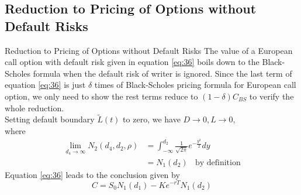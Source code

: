 \documentclass[pdf]{beamer}
\begin{document}
\subsection{Reduction to Pricing of Options without Default Risks}
\begin{frame}[allowframebreaks]{Reduction to Pricing of Options without Default Risks}
The value of a European call option with default risk given in equation \eqref{eq:36} boils down to the Black-Scholes formula when the default risk of writer is ignored. Since the last term of equation \eqref{eq:36} is just $\delta$ times of Black-Scholes pricing formula for European call option, we only need to show the rest terms reduce to $(1-\delta) C_{B S}$ to verify the whole reduction.\\
Setting default boundary $\tilde{L}(t)$ to zero, we have $D \rightarrow 0, L \rightarrow 0,$\\
where
$$
\begin{aligned}
\lim_{d_{4} \rightarrow \infty} N_{2}(d_{4}, d_{2}, \rho) &= \int_{-\infty}^{d_{2}} \frac{1}{\sqrt{2 \pi}} e^{-\frac{ y^{2}}{2}} dy\\
&= N_{1} (d_{2})~~~~ \text{by definition}
\end{aligned}
$$
Equation \eqref{eq:36} leads to the conclusion given by
\begin{equation}
\label{eq:38}
C = S_{0}N_{1}(d_{1})- Ke^{-rT}N_{1}(d_{2})
\end{equation}
\end{frame}
\end{document}
